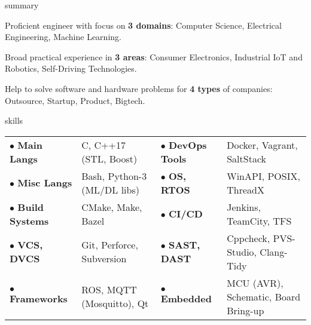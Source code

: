 \documentclass{Vladimir.Ivanov.CV}
\begin{document}
\begin{rSection}{summary}
\begin{rItemize}

\item Proficient engineer with focus on \textbf{3 domains}: Computer Science, Electrical Engineering, Machine Learning.
\item Broad practical experience in \textbf{3 areas}: Consumer Electronics, Industrial IoT and Robotics, Self-Driving Technologies.
\item Help to solve software and hardware problems for \textbf{4 types} of companies: Outsource, Startup, Product, Bigtech.

\end{rItemize}
\end{rSection}

\begin{rSection}{skills}
\begin{tabular}{llll}

$\bullet$ \textbf{Main Langs}    & C, C++17 (STL, Boost)       & $\bullet$ \textbf{DevOps Tools} & Docker, Vagrant, SaltStack \\
$\bullet$ \textbf{Misc Langs}    & Bash, Python-3 (ML/DL libs) & $\bullet$ \textbf{OS, RTOS}     & WinAPI, POSIX, ThreadX \\
$\bullet$ \textbf{Build Systems} & CMake, Make, Bazel          & $\bullet$ \textbf{CI/CD}        & Jenkins, TeamCity, TFS \\
$\bullet$ \textbf{VCS, DVCS}     & Git, Perforce, Subversion   & $\bullet$ \textbf{SAST, DAST}   & Cppcheck, PVS-Studio, Clang-Tidy \\
$\bullet$ \textbf{Frameworks}    & ROS, MQTT (Mosquitto), Qt   & $\bullet$ \textbf{Embedded}     & MCU (AVR), Schematic, Board Bring-up

\end{tabular}
\end{rSection}
\end{document}

